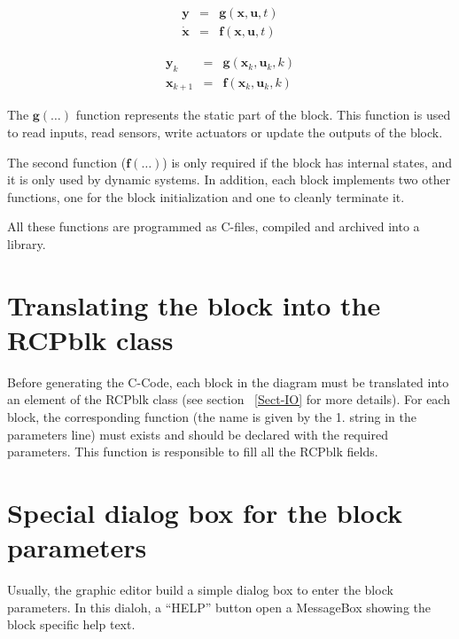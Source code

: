 \begin{equation}
\label{eq:syscont}
\begin{array}{lll}
\mathbf{y} & = & \mathbf{g}(\mathbf{x},\mathbf{u},t) \\
\dot{\mathbf{x}} & = & \mathbf{f}(\mathbf{x},\mathbf{u},t) 
\end{array}
\end{equation}

\begin{equation}
\label{eq:sysdisc}
\begin{array}{lll}
\mathbf{y}_k & = & \mathbf{g}(\mathbf{x}_k,\mathbf{u}_k,k) \\
\mathbf{x}_{k+1} & = & \mathbf{f}(\mathbf{x}_k,\mathbf{u}_k,k) 
\end{array}
\end{equation}

The $\mathbf{g}(\ldots)$ function represents the static part of the block. 
This function is used to read inputs, read sensors, write actuators or 
update the outputs of the block.

The second function ($\mathbf{f}(\ldots)$) is only required if the block has 
internal states, and it is only used by dynamic systems. In 
addition, each block implements two other functions, one for the block 
initialization and one to cleanly terminate it.

All these functions are programmed as C-files, compiled and archived into a 
library.

\section{Translating the block into the RCPblk class}
Before generating the C-Code, each block in the diagram must be translated into 
an element of the RCPblk class (see section ~\ref{Sect-IO} for more details).
For each block, the corresponding function (the name is given by the 1. string 
in the parameters line) 
must exists and should be declared with the required parameters. This function 
is responsible to fill all the RCPblk fields.

\section{Special dialog box for the block parameters}
Usually, the graphic editor build a simple dialog box to enter the block 
parameters. In this dialoh, a ``HELP'' button open a MessageBox showing the block specific help text.

